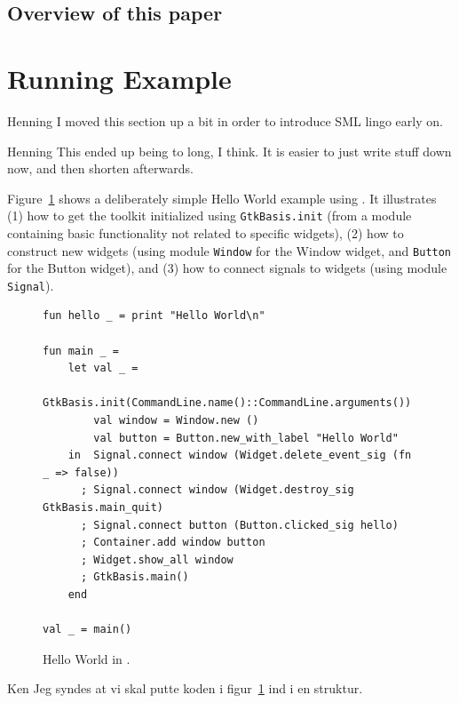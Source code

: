\documentclass[workingdraft,endnotes]{usetex-v1}
\begin{document}
\subsection{Overview of this paper}
\label{sec:overview-this-paper}



\section{Running Example}
\label{sec:example}

\begin{ednote}{Henning}
  I moved this section up a bit in order to introduce SML lingo
  early on.
\end{ednote}

\begin{ednote}{Henning}
  This ended up being to long, I think.
  It is easier to just write stuff down now, and then shorten
  afterwards.
\end{ednote}

Figure~\ref{fig:hello-world} shows a deliberately simple Hello World
example using \mgtk. It illustrates (1) how to get the toolkit
initialized using \texttt{GtkBasis.init} (from a module containing
basic \gtk functionality not related to specific widgets), (2) how to
construct new widgets (using module \texttt{Window} for the Window
widget, and \texttt{Button} for the Button widget), and (3) how to
connect signals to widgets (using module \texttt{Signal}).
\begin{figure}[htbp]
\begin{centering}
\begin{verbatim}
fun hello _ = print "Hello World\n"

fun main _ =
    let val _ = 
           GtkBasis.init(CommandLine.name()::CommandLine.arguments())
        val window = Window.new ()
        val button = Button.new_with_label "Hello World"
    in  Signal.connect window (Widget.delete_event_sig (fn _ => false))
      ; Signal.connect window (Widget.destroy_sig GtkBasis.main_quit)
      ; Signal.connect button (Button.clicked_sig hello)
      ; Container.add window button
      ; Widget.show_all window
      ; GtkBasis.main() 
    end

val _ = main()
\end{verbatim}
\caption{Hello World in \mgtk.\label{fig:hello-world}}
\end{centering}
\end{figure}

\begin{ednote}{Ken}
  Jeg syndes at vi skal putte koden i figur~\ref{fig:hello-world} ind
  i en struktur.
\end{ednote}
\end{document}
